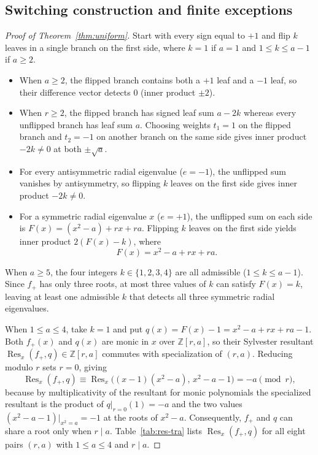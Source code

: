 \documentclass[11pt]{article}
\theoremstyle{plain}
\theoremstyle{remark}
\DeclareMathOperator{\Res}{Res}
\begin{document}
\subsection{Switching construction and finite exceptions}\label{sec:switching-tra}

\begin{proof}[Proof of Theorem~\ref{thm:uniform}]
Start with every sign equal to $+1$ and flip $k$ leaves in a single branch on
the first side, where $k=1$ if $a=1$ and $1 \leq k \leq a-1$ if $a \geq 2$.

\begin{itemize}
\item When $a \geq 2$, the flipped branch contains both a $+1$ leaf and a $-1$
  leaf, so their difference vector detects $0$ (inner product $\pm 2$).
\item When $r \geq 2$, the flipped branch has signed leaf sum $a - 2k$ whereas
  every unflipped branch has leaf sum $a$. Choosing weights $t_1=1$ on the
  flipped branch and $t_2=-1$ on another branch on the same side gives inner
  product $-2k \neq 0$ at both $\pm\sqrt{a}$.
\item For every antisymmetric radial eigenvalue ($e=-1$), the unflipped sum
  vanishes by antisymmetry, so flipping $k$ leaves on the first side gives
  inner product $-2k \neq 0$.
\item For a symmetric radial eigenvalue $x$ ($e=+1$), the unflipped sum on each
  side is $F(x) = (x^2-a) + rx + ra$. Flipping $k$ leaves on the first side
  yields inner product $2(F(x) - k)$, where
  \[
    F(x) = x^2 - a + rx + ra.
  \]
\end{itemize}

When $a \geq 5$, the four integers $k \in \{1,2,3,4\}$ are all admissible
($1 \leq k \leq a-1$). Since $f_+$ has only three roots, at most three values
of $k$ can satisfy $F(x) = k$, leaving at least one admissible $k$ that detects
all three symmetric radial eigenvalues.

When $1 \leq a \leq 4$, take $k = 1$ and put
$q(x) = F(x) - 1 = x^2 - a + rx + ra - 1$. Both $f_+(x)$ and $q(x)$ are monic
in $x$ over $\mathbb{Z}[r,a]$, so their Sylvester resultant
$\Res_x(f_+, q) \in \mathbb{Z}[r,a]$ commutes with specialization of $(r,a)$.
Reducing modulo $r$ sets $r = 0$, giving
\[
  \Res_x(f_+, q)
  \equiv \Res_x\bigl((x-1)(x^2-a),\, x^2-a-1\bigr)
  = -a \pmod{r},
\]
because by multiplicativity of the resultant for monic polynomials the
specialized resultant is the product of $q|_{r=0}(1) = -a$ and the two values
$(x^2-a-1)|_{x^2=a} = -1$ at the roots of $x^2-a$. Consequently, $f_+$ and $q$
can share a root only when $r \mid a$. Table~\ref{tab:res-tra} lists
$\Res_x(f_+, q)$ for all eight pairs $(r,a)$ with $1 \leq a \leq 4$ and
$r \mid a$.


\end{proof}
\end{document}
